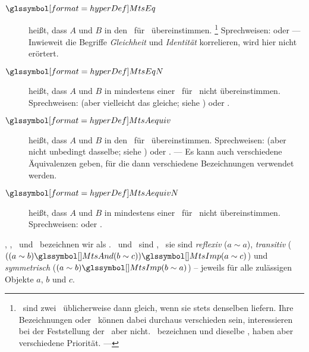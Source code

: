 \begin{description}
	\item[$\defSym{\MtsEq}$]  \label{def-Gleichheit}
	 heißt, dass $A$ und $B$ in den \interessierendenEigenschaften\ für \MtsEq\ übereinstimmen.%
	\footnote{%
		\textZB\ sind zwei \Junktoren\ üblicherweise dann gleich, wenn sie stets denselben \emph{\Wahrheitswert} liefern.
		Ihre Bezeichnungen oder \Symbole\ können dabei durchaus verschieden sein, interessieren bei der Feststellung der \Gleichheit\ aber nicht.
		\textZB\ bezeichnen \chrqt{\MtsAnd} und \chrqt{\MtsUnd} dieselbe \Operation, haben aber verschiedene Priorität. --- 
	}
	Sprechweisen:  oder 
	--- Inwieweit die Begriffe \emph{Gleichheit} und \emph{Identität} korrelieren, wird hier nicht erörtert.
	\item[$\defSym{\MtsEqN}$]  \label{def-Ungleichheit}
	 heißt, dass $A$ und $B$ in mindestens einer \interessierendenEigenschaft\ für \MtsEq\ nicht übereinstimmen.
	Sprechweisen:  (aber vielleicht das gleiche; siehe \MtsEquiv) oder .
	\item[$\defSym{\MtsAequiv}$]  \label{def-Aequivalenz}
	 heißt, dass $A$ und $B$ in den \interessierendenEigenschaften\ für \MtsAequiv\ übereinstimmen.
	Sprechweisen:  (aber nicht unbedingt dasselbe; siehe \MtsEq) oder .
	--- Es kann auch verschiedene Äquivalenzen geben, für die dann verschiedene Bezeichnungen verwendet werden.
	\item[$\defSym{\MtsAequivN}$]  \label{def-Kontravalenz}
	 heißt, dass $A$ und $B$ in mindestens einer \interessierendenEigenschaft\ für \MtsAequivN\ nicht übereinstimmen.
	Sprechweisen:  oder .
\end{description}

\MtsEq, \MtsEqN, \MtsAequiv\ und \MtsAequivN\ bezeichnen wir als  .
\Gleichheit\ und \Aequivalenz\ sind , \textdh\ sie sind \emph{reflexiv} ($a \sim a$), \emph{transitiv} ($((a \sim b) \MtsAnd (b \sim c)) \MtsImp (a \sim c)$) und \emph{symmetrisch} ($(a \sim b) \MtsImp (b \sim a)$)
-- jeweils für alle zulässigen Objekte $a$, $b$ und $c$.

